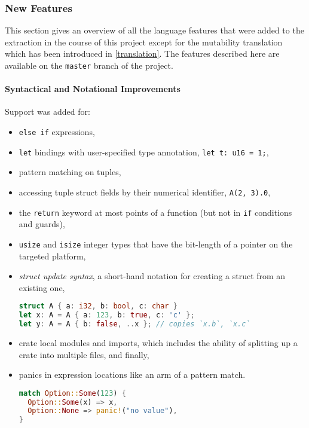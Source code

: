 \subsubsection{New Features}

This section gives an overview of all the language features that were added to
the extraction in the course of this project except for the mutability
translation which has been introduced in \autoref{translation}. The features
described here are available on the \lstinline!master! branch of the project.

\paragraph{Syntactical and Notational Improvements}

Support was added for:

\begin{itemize}
\item
  \passthrough{\lstinline!else if!} expressions,
\item
  \passthrough{\lstinline!let!} bindings with user-specified type
  annotation, \passthrough{\lstinline!let t: u16 = 1;!},
\item
  pattern matching on tuples,
\item
  accessing tuple struct fields by their numerical identifier,
  \passthrough{\lstinline!A(2, 3).0!},
\item
  the \passthrough{\lstinline!return!} keyword at most points
  of a function (but not in \lstinline!if! conditions and guards),
\item
  \passthrough{\lstinline!usize!} and \passthrough{\lstinline!isize!}
  integer types that have the bit-length of a pointer on the targeted
  platform,
\item
  \emph{struct update syntax}, a short-hand notation for creating a
  struct from an existing one,
\begin{lstlisting}[language=Rust, style=short]
struct A { a: i32, b: bool, c: char }
let x: A = A { a: 123, b: true, c: 'c' };
let y: A = A { b: false, ..x }; // copies `x.b`, `x.c`
\end{lstlisting}

\item
  crate local modules and imports, which includes the ability of
  splitting up a crate into multiple files, and finally,
\item
  panics in expression locations like an arm of a pattern match.
\begin{lstlisting}[language=Rust, style=short]
match Option::Some(123) {
  Option::Some(x) => x,
  Option::None => panic!("no value"),
}
\end{lstlisting}

\end{itemize}

